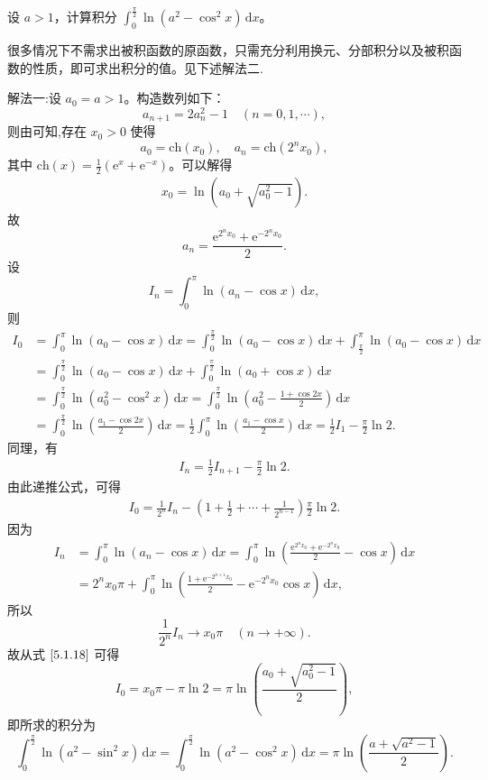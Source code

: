 \documentclass[../../main.tex]{subfiles}%
\begin{document}
\begin{example}
设 \( a > 1 \)，计算积分 \( \int_{0}^{\frac{\pi}{2}} \ln(a^2 - \cos^2 x) \, \mathrm{d}x \)。
\end{example}
\begin{remark}
很多情况下不需求出被积函数的原函数，只需充分利用换元、分部积分以及被积函数的性质，即可求出积分的值。见下述解法二.
\end{remark}
\begin{solution}

{\color{blue}解法一:}设 \( a_0 = a > 1 \)。构造数列如下：
\[
a_{n + 1} = 2a_n^2 - 1 \quad (n = 0, 1, \cdots),
\]
则由可知,存在 \( x_0 > 0 \) 使得
\[
a_0 = \text{ch}(x_0), \quad a_n = \text{ch}(2^n x_0),
\]
其中 \( \text{ch}(x) = \frac{1}{2}(\text{e}^x + \text{e}^{-x}) \)。可以解得
\begin{align}
x_0 = \ln \left( a_0 + \sqrt{a_0^2 - 1} \right). \label{5.1.16}
\end{align}
故
\[
a_n = \frac{\text{e}^{2^n x_0} + \text{e}^{-2^n x_0}}{2}.
\]
设
\[
I_n = \int_{0}^{\pi} \ln(a_n - \cos x) \, \mathrm{d}x,
\]
则
\begin{align*}
I_0 &= \int_{0}^{\pi} \ln(a_0 - \cos x) \, \mathrm{d}x = \int_{0}^{\frac{\pi}{2}} \ln(a_0 - \cos x) \, \mathrm{d}x + \int_{\frac{\pi}{2}}^{\pi} \ln(a_0 - \cos x) \, \mathrm{d}x
\\
&= \int_{0}^{\frac{\pi}{2}} \ln(a_0 - \cos x) \, \mathrm{d}x + \int_{0}^{\frac{\pi}{2}} \ln(a_0 + \cos x) \, \mathrm{d}x
\\
&= \int_{0}^{\frac{\pi}{2}} \ln(a_0^2 - \cos^2 x) \, \mathrm{d}x = \int_{0}^{\frac{\pi}{2}} \ln \left( a_0^2 - \frac{1 + \cos 2x}{2} \right) \, \mathrm{d}x
\\
&= \int_{0}^{\frac{\pi}{2}} \ln \left( \frac{a_1 - \cos 2x}{2} \right) \, \mathrm{d}x = \frac{1}{2} \int_{0}^{\pi} \ln \left( \frac{a_1 - \cos x}{2} \right) \, \mathrm{d}x = \frac{1}{2} I_1 - \frac{\pi}{2} \ln 2.
\end{align*}
同理，有
\begin{align}
I_n = \frac{1}{2} I_{n + 1} - \frac{\pi}{2} \ln 2. \label{5.1.17}
\end{align}
由此递推公式，可得
\begin{align}
I_0 = \frac{1}{2^n} I_n - \left( 1 + \frac{1}{2} + \cdots + \frac{1}{2^{n - 1}} \right) \frac{\pi}{2} \ln 2. \label{5.1.18}
\end{align}
因为
\begin{align*}
I_n &= \int_{0}^{\pi} \ln(a_n - \cos x) \, \mathrm{d}x = \int_{0}^{\pi} \ln \left( \frac{\text{e}^{2^n x_0} + \text{e}^{-2^n x_0}}{2} - \cos x \right) \, \mathrm{d}x
\\
&= 2^n x_0 \pi + \int_{0}^{\pi} \ln \left( \frac{1 + \text{e}^{-2^{n + 1} x_0}}{2} - \text{e}^{-2^n x_0} \cos x \right) \, \mathrm{d}x,
\end{align*}
所以
\[
\frac{1}{2^n} I_n \to x_0 \pi \quad (n \to +\infty).
\]
故从式 \(\eqref{5.1.18}\) 可得
\[
I_0 = x_0 \pi - \pi \ln 2 = \pi \ln \left( \frac{a_0 + \sqrt{a_0^2 - 1}}{2} \right),
\]
即所求的积分为
\[
\int_{0}^{\frac{\pi}{2}} \ln(a^2 - \sin^2 x) \, \mathrm{d}x = \int_{0}^{\frac{\pi}{2}} \ln(a^2 - \cos^2 x) \, \mathrm{d}x = \pi \ln \left( \frac{a + \sqrt{a^2 - 1}}{2} \right).
\]


\end{solution}
\end{document}
